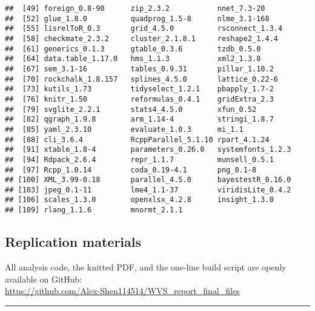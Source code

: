 \documentclass[
  11pt,
]{article}
\begin{document}
\begin{verbatim}
##  [49] foreign_0.8-90      zip_2.3.2           nnet_7.3-20        
##  [52] glue_1.8.0          quadprog_1.5-8      nlme_3.1-168       
##  [55] lisrelToR_0.3       grid_4.5.0          rsconnect_1.3.4    
##  [58] checkmate_2.3.2     cluster_2.1.8.1     reshape2_1.4.4     
##  [61] generics_0.1.3      gtable_0.3.6        tzdb_0.5.0         
##  [64] data.table_1.17.0   hms_1.1.3           xml2_1.3.8         
##  [67] sem_3.1-16          tables_0.9.31       pillar_1.10.2      
##  [70] rockchalk_1.8.157   splines_4.5.0       lattice_0.22-6     
##  [73] kutils_1.73         tidyselect_1.2.1    pbapply_1.7-2      
##  [76] knitr_1.50          reformulas_0.4.1    gridExtra_2.3      
##  [79] svglite_2.2.1       stats4_4.5.0        xfun_0.52          
##  [82] qgraph_1.9.8        arm_1.14-4          stringi_1.8.7      
##  [85] yaml_2.3.10         evaluate_1.0.3      mi_1.1             
##  [88] cli_3.6.4           RcppParallel_5.1.10 rpart_4.1.24       
##  [91] xtable_1.8-4        parameters_0.26.0   systemfonts_1.2.3  
##  [94] Rdpack_2.6.4        repr_1.1.7          munsell_0.5.1      
##  [97] Rcpp_1.0.14         coda_0.19-4.1       png_0.1-8          
## [100] XML_3.99-0.18       parallel_4.5.0      bayestestR_0.16.0  
## [103] jpeg_0.1-11         lme4_1.1-37         viridisLite_0.4.2  
## [106] scales_1.3.0        openxlsx_4.2.8      insight_1.3.0      
## [109] rlang_1.1.6         mnormt_2.1.1
\end{verbatim}

\subsection{Replication materials}\label{replication-materials}

All analysis code, the knitted PDF, and the one-line build script are
openly available on GitHub:\\
\url{https://github.com/Alex-Shen114514/WVS_report_final_files}

\begin{center}\rule{0.5\linewidth}{0.5pt}\end{center}
\end{document}
